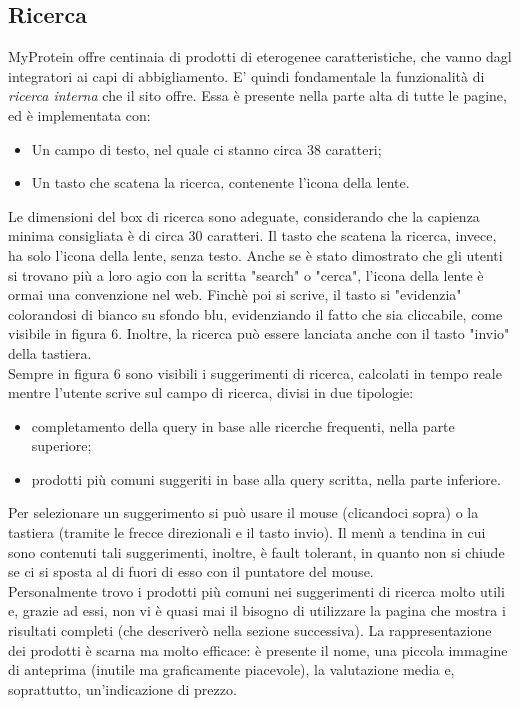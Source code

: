 \subsection{Ricerca}
MyProtein offre centinaia di prodotti di eterogenee caratteristiche, che vanno dagl integratori ai capi di abbigliamento. E' quindi fondamentale la funzionalità di \textit{ricerca interna} che il sito offre. Essa è presente nella parte alta di tutte le pagine, ed è implementata con:
\begin{itemize}
    \item Un campo di testo, nel quale ci stanno circa 38 caratteri;
    \item Un tasto che scatena la ricerca, contenente l'icona della lente.
\end{itemize}
Le dimensioni del box di ricerca sono adeguate, considerando che la capienza minima consigliata è di circa 30 caratteri. Il tasto che scatena la ricerca, invece, ha solo l'icona della lente, senza testo. Anche se è stato dimostrato che gli utenti si trovano più a loro agio con la scritta "search" o "cerca", l'icona della lente è ormai una convenzione nel web. Finchè poi si scrive, il tasto si "evidenzia" colorandosi di bianco su sfondo blu, evidenziando il fatto che sia cliccabile, come visibile in figura 6. Inoltre, la ricerca può essere lanciata anche con il tasto "invio" della tastiera.\\
Sempre in figura 6 sono visibili i suggerimenti di ricerca, calcolati in tempo reale mentre l'utente scrive sul campo di ricerca, divisi in due tipologie:
\begin{itemize}
    \item completamento della query in base alle ricerche frequenti, nella parte superiore;
    \item prodotti più comuni suggeriti in base alla query scritta, nella parte inferiore.
\end{itemize}
Per selezionare un suggerimento si può usare il mouse (clicandoci sopra) o la tastiera (tramite le frecce direzionali e il tasto invio). Il menù a tendina in cui sono contenuti tali suggerimenti, inoltre, è fault tolerant, in quanto non si chiude se ci si sposta al di fuori di esso con il puntatore del mouse. \\
Personalmente trovo i prodotti più comuni nei suggerimenti di ricerca molto utili e, grazie ad essi, non vi è quasi mai il bisogno di utilizzare la pagina che mostra i risultati completi (che descriverò nella sezione successiva). La rappresentazione dei prodotti è scarna ma molto efficace: è presente il nome, una piccola immagine di anteprima (inutile ma graficamente piacevole), la valutazione media e, soprattutto, un'indicazione di prezzo.
